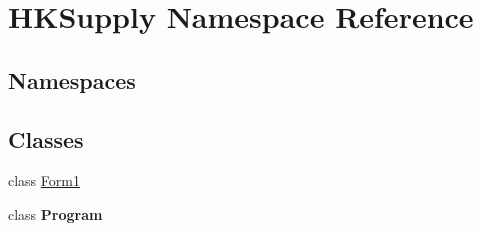 \hypertarget{namespace_h_k_supply}{}\section{H\+K\+Supply Namespace Reference}
\label{namespace_h_k_supply}
\subsection*{Namespaces}
\begin{DoxyCompactItemize}
\end{DoxyCompactItemize}
\subsection*{Classes}
\begin{DoxyCompactItemize}
\item 
class \mbox{\hyperlink{class_h_k_supply_1_1_form1}{Form1}}
\item 
class {\bfseries Program}
\end{DoxyCompactItemize}
